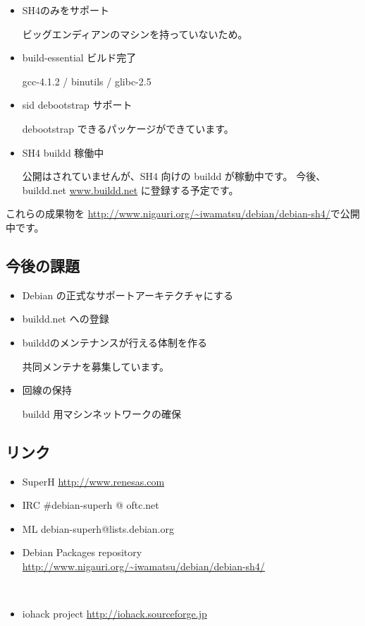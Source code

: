\documentclass[mingoth,a4paper]{jsarticle}
\begin{document}
\begin{itemize}
	\item SH4のみをサポート
	
		ビッグエンディアンのマシンを持っていないため。

	\item build-essential ビルド完了
	
		gcc-4.1.2 / binutils / glibc-2.5 

	\item sid debootstrap サポート
	
		debootstrap できるパッケージができています。

	\item SH4 buildd 稼働中
	
		公開はされていませんが、SH4 向けの buildd が稼動中です。
		今後、buildd.net \url{www.buildd.net} に登録する予定です。
		
\end{itemize}

これらの成果物を \url{http://www.nigauri.org/~iwamatsu/debian/debian-sh4/}で公開中です。

\subsection{今後の課題}

\begin{itemize}

\item Debian の正式なサポートアーキテクチャにする
\item buildd.net への登録
\item builddのメンテナンスが行える体制を作る

	共同メンテナを募集しています。
\item 回線の保持 

	buildd 用マシンネットワークの確保

\end{itemize}

\subsection{リンク}

\begin{itemize}
    \item SuperH \url{http://www.renesas.com}
    \item IRC \#debian-superh @ oftc.net
    \item ML  debian-superh@lists.debian.org
    \item Debian Packages repository
	\url{http://www.nigauri.org/~iwamatsu/debian/debian-sh4/}

　　\item iohack project
	\url{http://iohack.sourceforge.jp}

\end{itemize}
\end{document}
